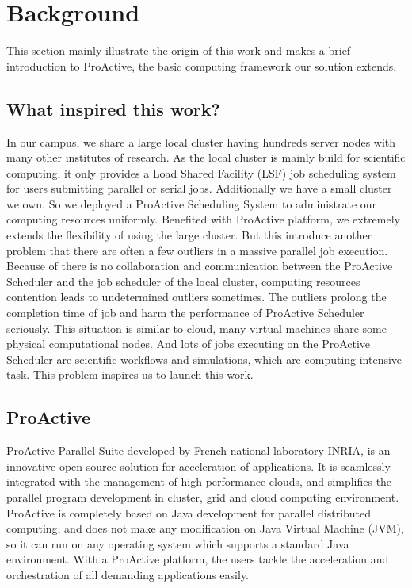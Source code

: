 \section{Background}


This section mainly illustrate the origin of this work and makes a brief introduction to ProActive, the basic computing framework our solution extends.

\subsection{What inspired this work?}

In our campus, we share a large local cluster having hundreds server nodes with many other institutes of research. As the local cluster is mainly build for scientific computing, it only provides a Load Shared Facility (LSF) job scheduling system for users submitting parallel or serial jobs. Additionally we have a small cluster we own. So we deployed a ProActive Scheduling System to administrate our computing resources uniformly. Benefited with ProActive platform, we extremely extends the flexibility of using the large cluster. But this introduce another problem that there are often a few outliers in a massive parallel job execution. Because of there is no collaboration and communication between the ProActive Scheduler and the job scheduler of the local cluster, computing resources contention leads to undetermined outliers sometimes. The outliers prolong the completion time of job and harm the performance of ProActive Scheduler seriously. This situation is similar to cloud, many virtual machines share some physical computational nodes. And lots of jobs executing on the ProActive Scheduler are scientific workflows and simulations, which are computing-intensive task. This problem inspires us to launch this work.

\subsection{ProActive}

ProActive Parallel Suite developed by French national laboratory INRIA, is an innovative open-source solution for acceleration of applications. It is seamlessly integrated with the management of high-performance clouds, and simplifies the parallel program development in cluster, grid and cloud computing environment. ProActive is completely based on Java development for parallel distributed computing, and does not make any modification on Java Virtual Machine (JVM), so it can run on any operating system which supports a standard Java environment. With a ProActive platform, the users tackle the acceleration and orchestration of all demanding applications easily. %


